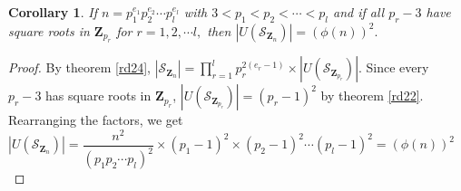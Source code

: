 \documentclass[sn-mathphys,Numbered]{sn-jnl}%
\theoremstyle{thmstyleone}
\theoremstyle{thmstyletwo}
\newtheorem{corollary}[theorem]{Corollary}
\theoremstyle{thmstylethree}
\begin{document}
\begin{corollary}
If $n=p_{1}^{e_{1}}p_{2}^{e_{2}} \cdots p_{l}^{e_{l}}$ with $3<p_{1}<p_{2}< \cdots <p_{l}$ and if all $p_{r}-3$ have square roots in $\mathbf{Z}_{p_{r}}$ for $r=1,2, \cdots l, $ then $|U(\mathcal{S}_{\mathbf{Z}_{n}})|=(\phi(n))^{2}.$
\end{corollary}
\begin{proof}
By theorem \ref{rd24}, $|\mathcal{S}_{\mathbf{Z}_{n}}|=\prod_{r=1}^{l} p_{r}^{2(e_{r}-1)} \times |U(\mathcal{S}_{\mathbf{Z}_{p_{r}}})|$. Since every $p_{r}-3$ has square roots in $\mathbf{Z}_{p_{r}}$, $|U(\mathcal{S}_{\mathbf{Z}_{p_{r}}})|=(p_{r}-1)^{2}$ by theorem \ref{rd22}. Rearranging the factors, we get 
$|U(\mathcal{S}_{\mathbf{Z}_{n}})|=\dfrac{n^{2}}{(p_{1}p_{2} \cdots p_{l})^{2}} \times (p_{1}-1)^{2} \times (p_{2}-1)^{2} \cdots (p_{l}-1)^{2}=(\phi(n))^{2}$
\end{proof}
\end{document}
